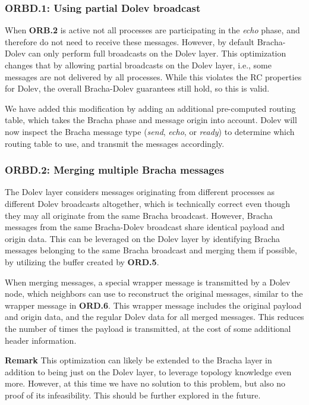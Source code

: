 \subsubsection{ORBD.1: Using partial Dolev broadcast}
When \textbf{ORB.2} is active not all processes are participating in the \textit{echo} phase, and therefore do not need to receive these messages. However, by default Bracha-Dolev can only perform full broadcasts on the Dolev layer. This optimization changes that by allowing partial broadcasts on the Dolev layer, i.e., some messages are not delivered by all processes. While this violates the RC properties for Dolev, the overall Bracha-Dolev guarantees still hold, so this is valid.

We have added this modification by adding an additional pre-computed routing table, which takes the Bracha phase and message origin into account. Dolev will now inspect the Bracha message type (\textit{send}, \textit{echo}, or \textit{ready}) to determine which routing table to use, and transmit the messages accordingly. 

\subsubsection{ORBD.2: Merging multiple Bracha messages}
The Dolev layer considers messages originating from different processes as different Dolev broadcasts altogether, which is technically correct even though they may all originate from the same Bracha broadcast. However, Bracha messages from the same Bracha-Dolev broadcast share identical payload and origin data. This can be leveraged on the Dolev layer by identifying Bracha messages belonging to the same Bracha broadcast and merging them if possible, by utilizing the buffer created by \textbf{ORD.5}.

When merging messages, a special wrapper message is transmitted by a Dolev node, which neighbors can use to reconstruct the original messages, similar to the wrapper message in \textbf{ORD.6}. This wrapper message includes the original payload and origin data, and the regular Dolev data for all merged messages. This reduces the number of times the payload is transmitted, at the cost of some additional header information.

\textbf{Remark}
This optimization can likely be extended to the Bracha layer in addition to being just on the Dolev layer, to leverage topology knowledge even more. However, at this time we have no solution to this problem, but also no proof of its infeasibility. This should be further explored in the future.
